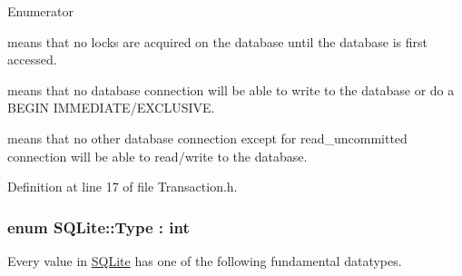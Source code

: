 \begin{Desc}
\item[Enumerator]\par
\begin{description}
\item[{\em 
\hypertarget{a00038_af94f2dd6dcae8699eada7a0382e48e66a4ed71db54748b36eeb398876b0c747ac}{Deferred}\label{a00038_af94f2dd6dcae8699eada7a0382e48e66a4ed71db54748b36eeb398876b0c747ac}
}]means that no locks are acquired on the database until the database is first accessed. \item[{\em 
\hypertarget{a00038_af94f2dd6dcae8699eada7a0382e48e66a43f6615bbb2c40a5306ff804094420b1}{Immediate}\label{a00038_af94f2dd6dcae8699eada7a0382e48e66a43f6615bbb2c40a5306ff804094420b1}
}]means that no database connection will be able to write to the database or do a B\-E\-G\-I\-N I\-M\-M\-E\-D\-I\-A\-T\-E/\-E\-X\-C\-L\-U\-S\-I\-V\-E. \item[{\em 
\hypertarget{a00038_af94f2dd6dcae8699eada7a0382e48e66a2ef50b4c466304dc6ac77bac8a779971}{Exclusive}\label{a00038_af94f2dd6dcae8699eada7a0382e48e66a2ef50b4c466304dc6ac77bac8a779971}
}]means that no other database connection except for read\-\_\-uncommitted connection will be able to read/write to the database. \end{description}
\end{Desc}


Definition at line 17 of file Transaction.\-h.

\hypertarget{a00038_ad7a8ff5f375eca25eb6e3a51d746a04c}{
\subsubsection[{Type}]{\setlength{\rightskip}{0pt plus 5cm}enum {\bf S\-Q\-Lite\-::\-Type} \-: int\hspace{0.3cm}{\ttfamily [strong]}}}\label{a00038_ad7a8ff5f375eca25eb6e3a51d746a04c}


Every value in \hyperlink{a00038}{S\-Q\-Lite} has one of the following fundamental datatypes. 

